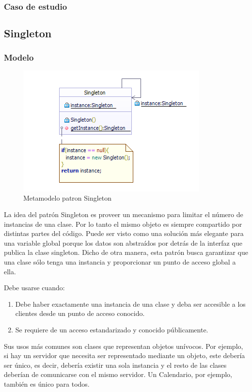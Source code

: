 \subsubsection{Caso de estudio}
\newpage

\subsection{Singleton}
\subsubsection{Modelo}
\begin{figure}[th!]
	\centering
	\includegraphics[width=0.7\linewidth]{arquitectura/imagenes/PatronSingelton}
	\caption{Metamodelo patron Singleton}
\end{figure}

La idea del patrón Singleton es proveer un mecanismo para limitar el número de instancias de una clase. Por lo tanto el mismo objeto es siempre compartido por distintas partes del código. Puede ser visto como una solución más elegante para una variable global porque los datos son abstraídos por detrás de la interfaz que publica la clase singleton.
Dicho de otra manera, esta patrón busca garantizar que una clase sólo tenga una instancia y proporcionar un punto de acceso global a ella.

Debe usarse cuando:
\begin{enumerate}
	\item Debe haber exactamente una instancia de una clase y deba ser accesible a los clientes desde un punto de acceso conocido.
	\item Se requiere de un acceso estandarizado y conocido públicamente.
\end{enumerate}
  

Sus usos más comunes son clases que representan objetos unívocos. Por ejemplo, si hay un servidor que necesita ser representado mediante un objeto, este debería ser único, es decir, debería existir una sola instancia y el resto de las clases deberían de comunicarse con el mismo servidor. Un Calendario, por ejemplo, también es único para todos.
\newline

